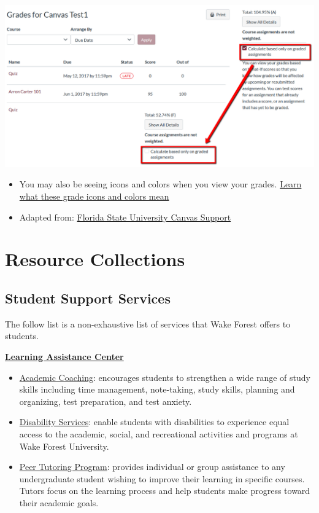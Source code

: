 \documentclass[
]{book}
\begin{document}
\begin{center}\includegraphics[width=0.5\linewidth]{img/grades} \end{center}

\begin{itemize}
\item
  You may also be seeing icons and colors when you view your grades. \href{https://community.canvaslms.com/t5/Student-Guide/How-do-I-use-the-icons-and-colors-in-the-Grades-page/ta-p/476}{Learn what these grade icons and colors mean}
\item
  Adapted from: \href{https://support.canvas.fsu.edu/kb/article/1068-students-make-sure-you-are-seeing-the-right-grades-in-canvas/}{Florida State University Canvas Support}
\end{itemize}

\hypertarget{resource-collections}{%
\section{Resource Collections}\label{resource-collections}}

\hypertarget{student-support-services}{%
\subsection{Student Support Services}\label{student-support-services}}

The follow list is a non-exhaustive list of services that Wake Forest offers to students.

\textbf{\href{https://class.wfu.edu/}{Learning Assistance Center}}

\begin{itemize}
\item
  \href{https://class.wfu.edu/}{Academic Coaching}: encourages students to strengthen a wide range of study skills including time management, note-taking, study skills, planning and organizing, test preparation, and test anxiety.
\item
  \href{https://class.wfu.edu/}{Disability Services}: enable students with disabilities to experience equal access to the academic, social, and recreational activities and programs at Wake Forest University.
\item
  \href{https://class.wfu.edu/}{Peer Tutoring Program}: provides individual or group assistance to any undergraduate student wishing to improve their learning in specific courses. Tutors focus on the learning process and help students make progress toward their academic goals.
\end{itemize}
\end{document}
